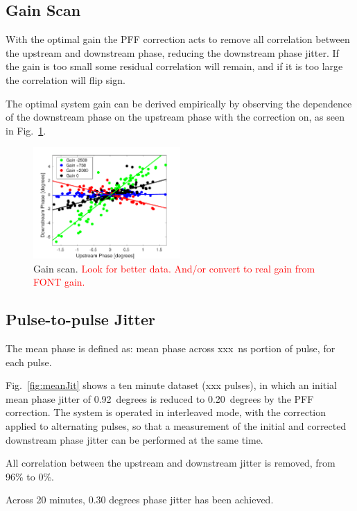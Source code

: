 \documentclass[%
 reprint,
 amsmath,amssymb,
 aps,
]{revtex4-1}
\begin{document}
\subsection{\label{ss:gScan}Gain Scan}

With the optimal gain the PFF correction acts to remove all correlation between 
the upstream and downstream phase, reducing the downstream phase jitter. If the 
gain is too small some residual correlation will remain, and if it is too large 
the correlation will flip sign. 

The optimal system gain can be derived empirically by observing the dependence 
of the downstream phase on the upstream phase with the correction on, as seen 
in Fig.~\ref{fig:gScan}.

\begin{figure}
\includegraphics[width=0.5\textwidth]{figs/gScan}%
\caption{\label{fig:gScan}Gain scan. \textcolor{red}{Look for better data. 
And/or convert to real gain from FONT gain.}}
\end{figure}


\subsection{\label{ss:meanJit}Pulse-to-pulse Jitter}

The mean phase is defined as: mean phase across xxx~ns portion of pulse, for 
each pulse.

Fig.~\ref{fig:meanJit} shows a ten minute dataset (xxx pulses), in which an 
initial mean phase jitter of 0.92~degrees is reduced to 0.20~degrees by the PFF 
correction. The system is operated in interleaved mode, with the correction 
applied to alternating pulses, so that a measurement of the initial and 
corrected downstream phase jitter can be performed at the same time.

All correlation between the upstream and downstream jitter is removed, from 
96\% to 0\%. 

Across 20 minutes, 0.30 degrees phase jitter has been achieved.
\end{document}
